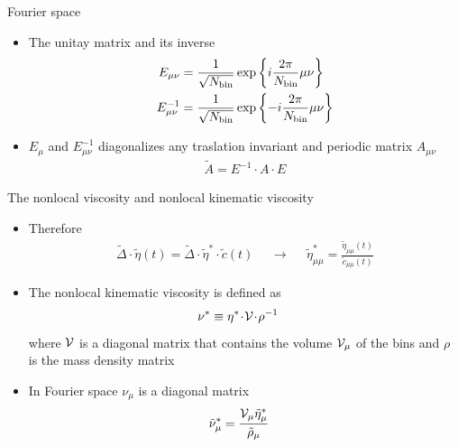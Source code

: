 \documentclass{beamer}
\newcommand{\esc}{\!\cdot\!}
\newcommand{\llangle}{\left\langle}
\newcommand{\rrangle}{\right\rangle}
\begin{document}
\begin{frame}{Fourier space}
  \begin{itemize}
    \item The unitay matrix and its inverse
\begin{align}
  E_{\mu\nu}&=\frac{1}{\sqrt{N_{\rm bin}}}\exp\left\{i\frac{2\pi}{N_{\rm bin}}\mu\nu\right\}
  \nonumber \\
  E^{-1}_{\mu\nu}&=\frac{1}{\sqrt{N_{\rm bin}}}\exp\left\{-i\frac{2\pi}{N_{\rm bin}}\mu\nu\right\}
\nonumber
\end{align} 
    \item $E_{\mu}$ and $E_{\mu\nu}^{-1}$ diagonalizes any traslation invariant and periodic matrix $A_{\mu\nu}$
      \begin{align}
      \tilde{A}=E^{-1}\cdot A\cdot E
      \nonumber
    \end{align}
  \end{itemize}
\end{frame}

\begin{frame}{The nonlocal viscosity and nonlocal kinematic viscosity}
  \begin{itemize}
  \item Therefore
\begin{align}
  \tilde{\Delta}\esc \tilde{\eta}(t) =\tilde{\Delta}\esc \tilde{\eta}^*\esc \tilde{c}(t)&& \rightarrow
  &&\tilde{\eta}_{\mu\mu}^*=\frac{\tilde{\eta}_{\mu\mu}(t) }{\tilde{c}_{\mu\mu}(t)}
\nonumber
\end{align}
\item The nonlocal kinematic viscosity is defined as
\begin{align}
\nu^*&\equiv  \eta^*\esc{\cal V}\esc \rho^{-1}
\nonumber
\end{align}
where ${\cal V}$ is a diagonal matrix that contains the volume ${\cal V}_{\mu}$ of the bins and $\rho$ is the mass density matrix
\item In Fourier space $\nu_{\mu}$ is a diagonal matrix
\begin{align}
  \tilde{\nu}_\mu^*&=  \frac{{\cal V}_\mu \tilde{\eta}_\mu^*}{\tilde{\rho}_\mu}
  \nonumber
\end{align}
 \end{itemize}
 \end{frame}
\end{document}
